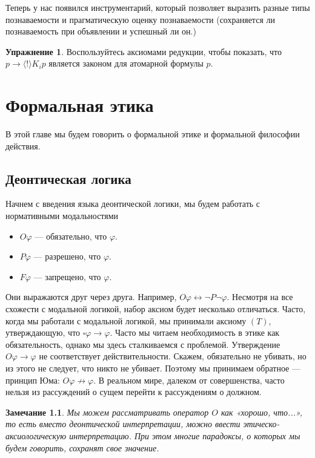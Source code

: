 \documentclass[openany]{book}
\theoremstyle{plain}
\newtheorem{note}{Замечание}[section]
\theoremstyle{definition}
\newtheorem{xrc}{Упражнение}[]
\begin{document}
Теперь у нас появился инструментарий, который позволяет выразить разные типы познаваемости и прагматическую оценку познаваемости (сохраняется ли познаваемость при объявлении и успешный ли он.)

\begin{xrc}
    Воспользуйтесь аксиомами редукции, чтобы показать, что \(p \to \langle ! \rangle K_i p\) является законом для атомарной формулы \(p\).
\end{xrc}



\chapter{Формальная этика}

В этой главе мы будем говорить о формальной этике и формальной философии действия.

\section{Деонтическая логика}

Начнем с введения языка деонтической логики, мы будем работать с нормативными модальностями 
\begin{itemize}
    \item \(O \varphi\) --- обязательно, что \(\varphi\).
    \item \(P \varphi\) --- разрешено, что \(\varphi\).
    \item \(F \varphi\) --- запрещено, что \(\varphi\).
\end{itemize}

Они выражаются друг через друга. Например, \(O \varphi \leftrightarrow \neg P \neg \varphi\).
Несмотря на все схожести с модальной логикой, набор аксиом будет несколько отличаться. Часто, когда мы работали с модальной логикой, мы принимали аксиому \((T)\), утверждающую, что \(\square \varphi \to \varphi\). Часто мы читаем необходимость в этике как обязательность, однако мы здесь сталкиваемся с проблемой. Утверждение \(O \varphi \to \varphi\) не соответствует действительности. Скажем, обязательно не убивать, но из этого не следует, что никто не убивает. Поэтому мы принимаем обратное --- принцип Юма: \(O \varphi \not\to \varphi\). В реальном мире, далеком от совершенства, часто нельзя из рассуждений о сущем перейти к рассуждениям о должном. 

\begin{note}
    Мы можем рассматривать оператор \(O\) как «хорошо, что...», то есть вместо деонтической интерпретации, можно ввести этическо-аксиологическую интерпретацию. При этом многие парадоксы, о которых мы будем говорить, сохранят свое значение.
\end{note}
\end{document}
